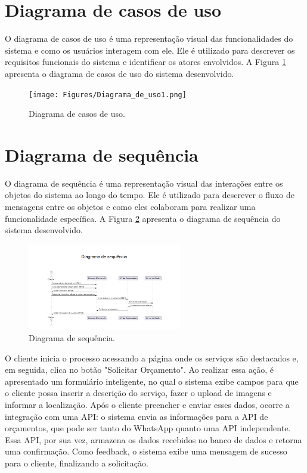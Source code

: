 \section{Diagrama de casos de uso}
\label{sec:casos}
O diagrama de casos de uso é uma representação visual das funcionalidades do sistema e como os usuários interagem com ele. Ele é utilizado para descrever os requisitos funcionais do sistema e identificar os atores envolvidos. A Figura \ref{fig:diagrama-uso} apresenta o diagrama de casos de uso do sistema desenvolvido.

\begin{figure}[H]
    \centering
    \texttt{[image: Figures/Diagrama\_de\_uso1.png]} %
    \caption{Diagrama de casos de uso.}
    \label{fig:diagrama-uso}
\end{figure}


\section{Diagrama de sequência}
\label{sec:sequencia}   
O diagrama de sequência é uma representação visual das interações entre os objetos do sistema ao longo do tempo. Ele é utilizado para descrever o fluxo de mensagens entre os objetos e como eles colaboram para realizar uma funcionalidade específica. A Figura \ref{fig:diagrama-sequencia} apresenta o diagrama de sequência do sistema desenvolvido.

\begin{figure}[H]
    \centering
    \includegraphics[width=0.6\textwidth]{Figures/seq.png} %
    \caption{Diagrama de sequência.}
    \label{fig:diagrama-sequencia}
\end{figure}

O cliente inicia o processo acessando a página onde os serviços são destacados e, em seguida, clica no botão "Solicitar Orçamento". Ao realizar essa ação, é apresentado um formulário inteligente, no qual o sistema exibe campos para que o cliente possa inserir a descrição do serviço, fazer o upload de imagens e informar a localização. Após o cliente preencher e enviar esses dados, ocorre a integração com uma API: o sistema envia as informações para a API de orçamentos, que pode ser tanto do WhatsApp quanto uma API independente. Essa API, por sua vez, armazena os dados recebidos no banco de dados e retorna uma confirmação. Como feedback, o sistema exibe uma mensagem de sucesso para o cliente, finalizando a solicitação.










